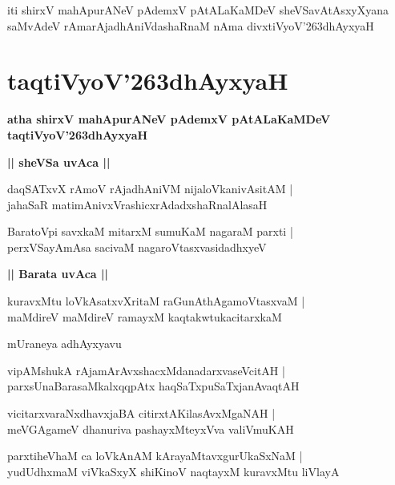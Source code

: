 \documentclass[twoside,12pt,openright]{book}
\def\S{\char'263}
\newcounter{shloka}[chapter]
\def\uvaca#1{\centerline{{\large\textbf{#1}}}}
\begin{document}
\begin{center}
iti shirxV mahApurANeV pAdemxV pAtALaKaMDeV sheVSavAtAsxyXyana saMvAdeV 
rAmarAjadhAniVdashaRnaM nAma divxtiVyoV\S dhAyxyaH
\end{center}

\chapter{taqtiVyoV\S dhAyxyaH}

\begin{center}
{\LARGE\bfseries atha shirxV mahApurANeV pAdemxV pAtALaKaMDeV taqtiVyoV\S dhAyxyaH}
\end{center}

\uvaca{|| sheVSa uvAca ||}

\begin{shloka}%
daqSATxvX rAmoV rAjadhAniVM nijaloVkanivAsitAM |\\
ja{}haSaR matimAnivxVrashicxrAdadxshaRnalAlasaH 
\end{shloka}

\begin{shloka}%
BaratoVpi savxkaM mitarxM sumuKaM nagaraM parxti |\\
perxVSayAmAsa sacivaM nagaroVtasxvasidadhxyeV 
\end{shloka}

\uvaca{|| Barata uvAca ||}

\begin{shloka}%
kuravxMtu loVkAsatxvXritaM raGunAthAgamoVtasxvaM |\\
maMdireV maMdireV ramayxM kaqtakwtukacitarxkaM 
\end{shloka}

\begin{center}
mUraneya adhAyxyavu
\end{center}

\begin{shloka}%
vipAMshukA rAjamArAvxshacxMdanadarxvaseVcitAH |\\
parxsUnaBarasaMkalxqqpAtx haqSaTxpuSaTxjanAvaqtAH 
\end{shloka}

\begin{shloka}%
vicitarxvaraNxdhavxjaBA citirxtAKilasAvxMgaNAH |\\
meVGAgameV dhanuriva pashayxMteyxVva valiVmuKAH 
\end{shloka}

\begin{shloka}%
parxtiheVhaM ca loVkAnAM kArayaMtavxgurUkaSxNaM |\\
yudUdhxmaM viVkaSxyX shiKinoV naqtayxM kuravxMtu liVlayA 
\end{shloka}
\end{document}
